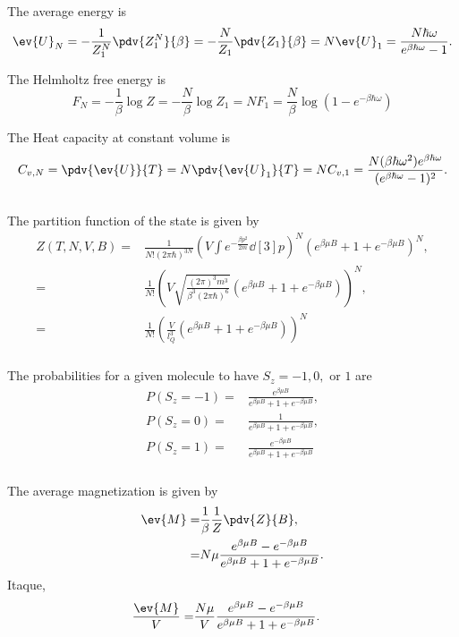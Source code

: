 \documentclass[a4paper,12pt,twoside]{article}
\begin{document}
\begin{multicols*}{2}
The average energy is
\begin{equation}
	\ev{U}_N = -\frac{1}{Z_1^N} \pdv{Z_1^N}{\beta} = -\frac{N}{Z_1} \pdv{Z_1}{\beta} = N\ev{U}_1 = \frac{N\hbar\omega}{e^{\beta\hbar\omega}-1}.
\end{equation}

The Helmholtz free energy is
\begin{equation}
	F_N = -\frac{1}{\beta}\log{Z} = -\frac{N}{\beta}\log{Z_1} = NF_1 = \frac{N}{\beta} \log(1-e^{-\beta\hbar\omega})
\end{equation}

The Heat capacity at constant volume is
\begin{equation}
	C_{v,N} = \pdv{\ev{U}}{T} = N\pdv{\ev{U}_1}{T} = N C_{v,1} =  \frac{N(\beta\hbar\omega^2)e^{\beta\hbar\omega}}{(e^{\beta\hbar\omega}-1)^2}.
\end{equation}

\subsection{}

The partition function of the state is given by
\begin{align}
	Z(T,N,V,B) =& \frac{1}{N!(2\pi\hbar)^{3N}}\left(V\int e^{-\frac{\beta p^2}{2m}} \dd[3]{p}\right)^N \left( e^{\beta\mu B}+1+e^{-\beta\mu B} \right)^N,\\
	=& \frac{1}{N!} \left(V\sqrt{\frac{(2\pi)^3 m^3}{\beta^3(2\pi\hbar)^{6}}} \left(e^{\beta\mu B}+1+e^{-\beta\mu B}\right)\right)^N,\\
	=& \frac{1}{N!} \left(\frac{V}{l_Q^3} \left(e^{\beta\mu B}+1+e^{-\beta\mu B}\right)\right)^N
\end{align}

\subsubsection{}
The probabilities for a given molecule to have $S_z = -1,0,$ or $1$ are
\begin{align}
	P(S_z = -1) =& \frac{e^{\beta\mu B}}{e^{\beta\mu B}+1+e^{-\beta\mu B}},\\
	P(S_z = 0) =& \frac{1}{e^{\beta\mu B}+1+e^{-\beta\mu B}},\\
	P(S_z = 1) =& \frac{e^{-\beta\mu B}}{e^{\beta\mu B}+1+e^{-\beta\mu B}}
\end{align}

\subsubsection{}
The average magnetization is given by
\begin{align}
	\ev{M} =& \frac{1}{\beta} \frac{1}{Z} \pdv{Z}{B},\\
	=& N\mu \frac{e^{\beta\mu B}-e^{-\beta\mu B}}{e^{\beta\mu B}+1+e^{-\beta\mu B}}.
\end{align}
Itaque,
\begin{align}
	\frac{\ev{M}}{V} =& \frac{N\mu}{V}\frac{e^{\beta\mu B}-e^{-\beta\mu B}}{e^{\beta\mu B}+1+e^{-\beta\mu B}}.
\end{align}


\end{multicols*}
\end{document}
